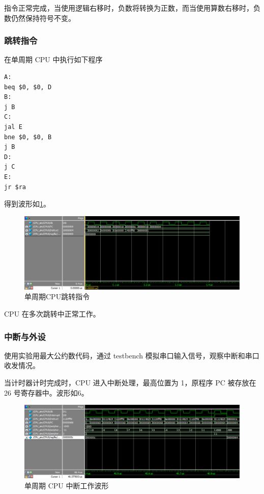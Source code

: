 \documentclass{ctexart}
\begin{document}
	指令正常完成，当使用逻辑右移时，负数将转换为正数，而当使用算数右移时，负数仍然保持符号不变。	

	\subsubsection{跳转指令}

	在单周期 CPU 中执行如下程序

\begin{lstlisting}
A:
beq $0, $0, D
B:
j B
C:
jal E
bne $0, $0, B
j B
D:
j C
E:
jr $ra
\end{lstlisting}	

	得到波形如\ref{simpicture5}。

	\begin{figure}[ht]
		\centering
		\includegraphics[width = \textwidth]{OneCycleTestWave4.eps}
		\caption{单周期CPU跳转指令}
		\label{simpicture5}
	\end{figure}		
	
	CPU 在多次跳转中正常工作。

	\subsubsection{中断与外设}

	使用实验用最大公约数代码，通过 testbench 模拟串口输入信号，观察中断和串口收发情况。

	当计时器计时完成时，CPU 进入中断处理，最高位置为 1，原程序 PC 被存放在 26 号寄存器中。波形如6。

	\begin{figure}[ht]
		\centering
		\includegraphics[width = \textwidth]{OneCycleTestWave5.eps}
		\caption{单周期 CPU 中断工作波形}
		\label{simpicture6}
	\end{figure}	
\end{document}
